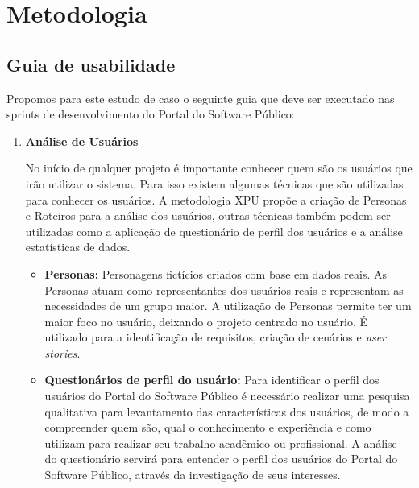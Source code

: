 \section{Metodologia}

\subsection{Guia de usabilidade}

	Propomos  para este estudo de caso o seguinte guia que deve ser executado nas sprints de desenvolvimento do Portal do Software Público:
	
\begin{enumerate}

	\item \textbf{Análise de Usuários}
	
	No início de qualquer projeto é importante conhecer quem são os usuários que irão utilizar o sistema. Para isso existem algumas técnicas que são utilizadas para conhecer os usuários.
	A metodologia XPU propõe a criação de Personas e Roteiros para a análise dos usuários, outras técnicas também podem ser utilizadas como a aplicação de questionário de perfil dos usuários e a análise estatísticas de dados.
	
	\begin{itemize}
		\item \textbf{Personas:} Personagens fictícios criados com base em dados reais. As Personas atuam como representantes dos usuários reais e representam as necessidades de um grupo maior. 
		A utilização de Personas permite ter um maior foco no usuário, deixando o projeto centrado no usuário. É utilizado para a identificação de requisitos, criação de cenários e \textit{user stories}. 
		
		\item \textbf{Questionários de perfil do usuário:} Para identificar o perfil dos usuários do Portal do Software Público é necessário realizar uma pesquisa qualitativa para levantamento das características  dos usuários, de modo a compreender quem são, qual o conhecimento e experiência e como utilizam para realizar seu trabalho acadêmico ou profissional. 
		A análise do questionário servirá para entender o perfil dos usuários do Portal do Software Público, através da investigação de seus interesses. 


\end{itemize}
\end{enumerate}
